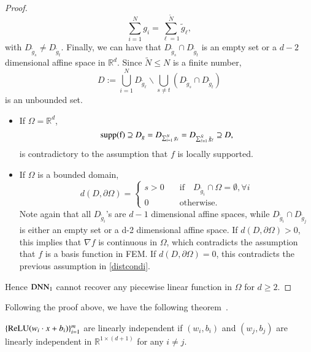 \begin{proof}
	$$
	\sum_{i=1}^N g_i = \sum_{\ell=1}^{\tilde N} \tilde g_{\ell},
	$$
	with $D_{\tilde g_s} \neq D_{\tilde g_t}$.
	Finally, we can have that $D_{\tilde g_s} \cap D_{\tilde g_t}$ is an empty set or a $d-2$ dimensional affine space in $\mathbb{R}^d$.
	Since
	$\tilde N \le N$ is a finite number, 
	$$
	D := \bigcup_{i=1}^N D_{\tilde g_\ell} \backslash \bigcup_{s\neq t}\left( D_{\tilde g_s}\cap D_{\tilde g_t} \right)
	$$
	is an unbounded set. 
	\begin{itemize}
		\item If $\Omega = \mathbb{R}^d$,
		$$
		{\rm supp(f)} \supseteq D_{g} = D_{\sum_{i=1}^N g_i} = D_{ \sum_{\ell=1}^{\tilde N} \tilde g_{\ell}} \supseteq D,
		$$ is contradictory to the assumption that $f$ is locally supported.
		\item If $\Omega$ is a bounded domain, 
		$$
		d(D, \partial \Omega) = 
		\begin{cases}
		s > 0 \quad &\text{if}\quad  D_{\tilde g_i} \cap \Omega = \emptyset, \forall i\\
		0 \quad &\text{otherwise}.
		\end{cases}
		$$
		Note again that all $D_{\tilde g_i}$'s are $d-1$ dimensional affine spaces, while $D_{\tilde g_i} \cap D_{\tilde g_j}$ is either an empty set or a d-2 dimensional affine space. 
		If $d(D, \partial \Omega) > 0$, this implies that $\nabla f$ is continuous in $\Omega$, which contradicts the  assumption that $f$ is a basis function in FEM.
		If $d(D, \partial \Omega) = 0$, this contradicts the previous assumption in \eqref{distcondi}.
	\end{itemize}
	Hence ${\rm DNN}_1$ cannot recover any piecewise linear function in $\Omega$ for $d \ge 2$.
\end{proof}

Following the proof above, we have the following theorem~\cite{he2020relu}.
\begin{theorem}\label{linearindep}
	$\{{\rm ReLU}(w_i\cdot x+b_i)\}_{i=1}^m$ are linearly independent if $(w_i,
	b_i)$ and $(w_j, b_j)$ are linearly independent in
	$\mathbb{R}^{1\times (d+1)} $ for any $i \neq j$.
\end{theorem}
